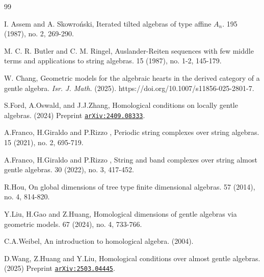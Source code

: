 \documentclass[11pt]{amsart}
\numberwithin{equation}{section}
\theoremstyle{definition}
\begin{document}
\begin{thebibliography}{99}

\newcommand{\au}[1]{\textrm{#1},}
\newcommand{\ti}[1]{\textrm{#1},}
\newcommand{\jo}[1]{\textit{#1}}
\newcommand{\vo}[1]{\textbf{#1}}
\newcommand{\yr}[1]{(#1)}
\newcommand{\pp}[2]{#1--#2.}
\newcommand{\arxiv}[1]{\href{http://arxiv.org/abs/#1}{arXiv:#1}}


I. Assem and A. Skowro\'{n}ski,
\newblock Iterated tilted algebras of type affine $A_n$.
 195 (1987), no. 2, 269-290.

 
M. C. R. Butler and C. M. Ringel,
\newblock Auslander-Reiten sequences with few middle terms and applications to string algebras.
 15 (1987), no. 1-2, 145-179.

W. Chang,
\newblock Geometric models for the algebraic hearts in the derived category of a gentle algebra. \emph{Isr. J. Math.} (2025). https://doi.org/10.1007/s11856-025-2801-7.


S.Ford, A.Oswald, and J.J.Zhang, 
\newblock Homological conditions on locally gentle algebras.
\newblock (2024) Preprint
  \href{https://arxiv.org/abs/2409.08333}{\texttt{arXiv:2409.08333}}.


A.Franco, H.Giraldo and   P.Rizzo , 
\newblock Periodic string complexes over string algebras.
 15 (2021), no. 2, 695-719.

A.Franco, H.Giraldo and   P.Rizzo , 
\newblock String and band complexes over string almost gentle algebras.
 30 (2022), no. 3, 417-452.


R.Hou,
\newblock On global dimensions of tree type finite dimensional algebras.
 57 (2014), no. 4, 814-820.


Y.Liu, H.Gao and  Z.Huang, 
\newblock Homological dimensions of gentle algebras via geometric models. 
 67 (2024), no. 4, 733-766.


C.A.Weibel, 
\newblock An introduction to homological algebra. 
 (2004).


D.Wang, Z.Huang and Y.Liu, 
\newblock Homological conditions over almost gentle algebras.
\newblock (2025) Preprint
\href{https://arxiv.org/abs/2503.04445}{\texttt{arXiv:2503.04445}}.















\end{thebibliography}
\end{document}
